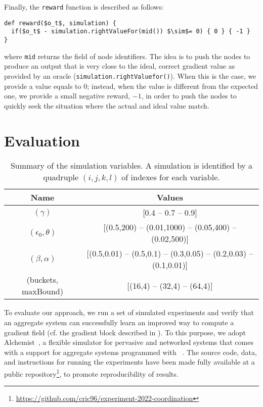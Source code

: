%
Finally, the \texttt{reward} function is described as follows: 
\begin{lstlisting}[mathescape]
def reward($o_t$, simulation) {
  if($o_t$ - simulation.rightValueFor(mid()) $\sim$= 0) { 0 } { -1 }
}
\end{lstlisting}
where \lstinline|mid| returns the field of node identifiers. 
The idea is to push the nodes to produce an output that is very close to the ideal, correct gradient value as provided by an oracle (\lstinline|simulation.rightValuefor()|).
When this is the case, we provide a value equals to $0$;
instead, when the value is different from the expected one, 
 we provide a small negative reward, $-1$, in order to push the nodes to quickly seek the situation where the actual and ideal value match.

\section{Evaluation}\label{coordination2022:s:eval}

\begin{table}[t]
  \centering
  \begin{tabular}{|c|c|}
    \hline
    Name &  Values \\ \hline
    $(\gamma)$ & [0.4 -- 0.7 -- 0.9] \\  \hline
    $(\epsilon_0, \theta)$ & [(0.5,200) -- (0.01,1000) -- (0.05,400) -- (0.02,500)] \\ \hline
    $(\beta, \alpha)$ & [(0.5,0.01) -- (0.5,0.1) -- (0.3,0.05) -- (0.2,0.03) -- (0.1,0.01)]
    \\  \hline
    (buckets, maxBound) & [(16,4) -- (32,4) -- (64,4)]\\ \hline
  \end{tabular}
  \caption{Summary of the simulation variables. 
  A simulation is identified by a quadruple $(i, j, k, l)$ of indexes for each variable. 
  }
  \label{coordination2022:table:parameters}
\end{table}

To evaluate our approach, we run a set of simulated experiments and verify that an aggregate system
 can successfully learn an improved way to compute a gradient field (cf. the gradient block described in ).
%
To this purpose, we adopt Alchemist~\cite{DBLP:journals/jos/PianiniMV13},
 a flexible simulator 
 for pervasive and networked systems
 that comes with a support for aggregate systems 
 programmed with \scafi{}~\cite{DBLP:conf/isola/CasadeiVAD20}. 
%
The source code, data, and instructions for running the experiments have been made fully available at a public repository\footnote{\url{https://github.com/cric96/experiment-2022-coordination}}, to promote reproducibility of results.

